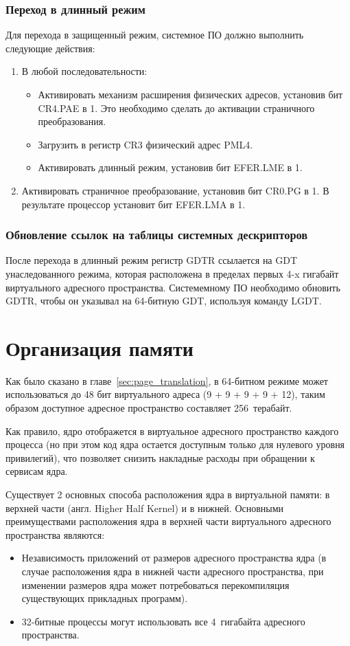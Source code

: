 \subsubsection*{Переход в длинный режим}
Для перехода в защищенный режим, системное ПО должно выполнить следующие действия:
\begin{enumerate}[1.]
\item В любой последовательности:
	\begin{itemize}
	\item Активировать механизм расширения физических адресов, установив бит CR4.PAE в 1. Это
		необходимо сделать до активации страничного преобразования.
	\item Загрузить в регистр CR3 физический адрес PML4.
	\item Активировать длинный режим, установив бит EFER.LME в 1.
	\end{itemize}
\item Активировать страничное преобразование, установив бит CR0.PG в 1. В результате процессор установит бит EFER.LMA в 1.
\end{enumerate}

\subsubsection*{Обновление ссылок на таблицы системных дескрипторов}
После перехода в длинный режим регистр GDTR ссылается на GDT унаследованного режима, которая расположена
в пределах первых 4-x гигабайт виртуального адресного пространства. Системемному ПО необходимо обновить GDTR,
чтобы он указывал на 64-битную GDT, используя команду LGDT.


\section{Организация памяти}
Как было сказано в главе~\ref{sec:page_translation}, в 64-битном режиме может использоваться
до 48 бит виртуального адреса (9 + 9 + 9 + 9 + 12), таким образом доступное адресное пространство
составляет 256~терабайт.

Как правило, ядро отображется в виртуальное адресного пространство каждого процесса (но при этом код ядра
остается доступным только для нулевого уровня привилегий), что позволяет снизить накладные расходы при
обращении к сервисам ядра.

Существует 2 основных способа расположения ядра в виртуальной памяти: в верхней части (англ. Higher Half Kernel)
и в нижней. Основными преимуществами расположения ядра в верхней части виртуального адресного пространства являются:
\begin{itemize}
\item Независимость приложений от размеров адресного пространства ядра (в случае расположения ядра в нижней части
	адресного пространства, при изменении размеров ядра может потребоваться перекомпиляция существующих
	прикладных программ).
\item 32-битные процессы могут использовать все 4~гигабайта адресного пространства.
\end{itemize}

